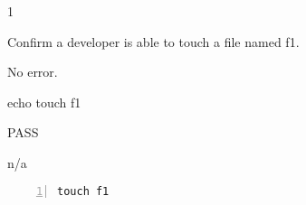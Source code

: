 \begin{description}[align=right,leftmargin=3.2cm,labelindent=3.0cm]
\item[Step:] 1
\item[Confirm:] Confirm a developer is able to touch a file named f1.
\item[Expectation:] No error.
\item[Command:] echo touch  f1
\item[Test Result:] PASS
\item[Evidence:] n/a
\end{description}
\begin{lstlisting}[numbers=left]
touch f1

\end{lstlisting}
